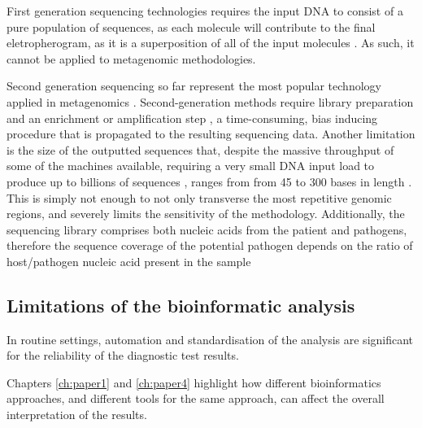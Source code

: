First generation sequencing technologies requires the input \ac{DNA} to consist of a pure population of sequences, as each molecule will contribute to the final eletropherogram, as it is a superposition of all of the input molecules \citep{hagemann_overview_2015}. As such, it cannot be applied to metagenomic methodologies. 

Second generation sequencing so far represent the most popular technology applied in metagenomics \citep{rossen_practical_2018, loman_twenty_2015, loman_high-throughput_2012}. Second-generation methods require library preparation and an enrichment or amplification step \citep{hagemann_overview_2015}, a time-consuming, bias inducing procedure that is propagated to the resulting sequencing data. Another limitation is the size of the outputted sequences that, despite the massive throughput of some of the machines available, requiring a very small \ac{DNA} input load to produce up to billions of sequences \citep{loman_twenty_2015}, ranges from from 45 to 300 bases in length \citep{loman_performance_2012}. This is simply not enough to not only transverse the most repetitive genomic regions, and severely limits the sensitivity of the methodology. Additionally, the sequencing library comprises both nucleic acids from the patient and pathogens, therefore the sequence coverage of the potential pathogen depends on the ratio of host/pathogen nucleic acid present in the sample

\subsection{Limitations of the bioinformatic analysis}

In routine settings, automation and standardisation of the analysis are significant for the reliability of the diagnostic test results. 

Chapters \ref{ch:paper1} and \ref{ch:paper4} highlight how different bioinformatics approaches, and different tools for the same approach, can affect the overall interpretation of the results. 